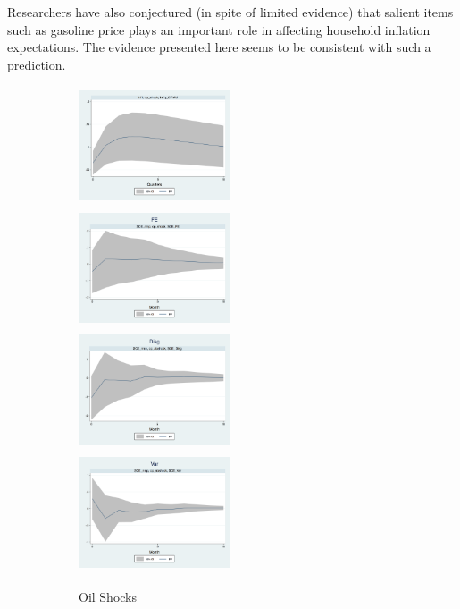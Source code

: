 \documentclass[12pt]{article}
\begin{document}
	Researchers have also conjectured (in spite of limited evidence) that salient items such as gasoline price plays an important role in affecting household inflation expectations. The evidence presented here seems to be consistent with such a prediction. 
	
	
	
	\begin{figure}[p]
		
		\begin{subfigure}[b]{0.35\textwidth}
			\centering
			\caption{Oil Shocks}
			\includegraphics[width=4.5cm,height=3.5cm]{figures/CPIAU_ashocks_nmpM.png}
			\smallskip
			\includegraphics[width=4.5cm,height=3.5cm]{figures/SCEFE_ashocks_nmpM.png} 
			\smallskip
			\includegraphics[width=4.5cm,height=3.5cm]{figures/SCEDisg_ab_ashocks_nmpM.png}
			\smallskip
			\includegraphics[width=4.5cm,height=3.5cm]{figures/SCEVar_ab_ashocks_nmpM.png}
		\end{subfigure}
		\hfill
		\begin{subfigure}[b]{0.65\textwidth}
			\centering

\end{subfigure}
\end{figure}
\end{document}

